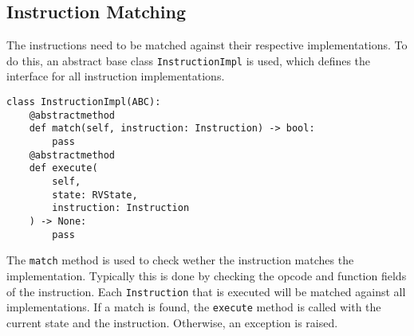 \documentclass[sigconf]{acmart}
\begin{document}
\subsection{Instruction Matching}\label{sec:instruction-matching}
The instructions need to be matched against their respective implementations. To do this, an abstract base class \texttt{InstructionImpl} is used, which defines the interface for all instruction implementations.
\begin{verbatim}
class InstructionImpl(ABC):
    @abstractmethod
    def match(self, instruction: Instruction) -> bool:
        pass
    @abstractmethod
    def execute(
        self, 
        state: RVState, 
        instruction: Instruction
    ) -> None:
        pass
\end{verbatim}
The \texttt{match} method is used to check wether the instruction matches the implementation. Typically this is done by checking the opcode and function fields of the instruction.
Each \texttt{Instruction} that is executed will be matched against all implementations. 
If a match is found, the \texttt{execute} method is called with the current state and the instruction. Otherwise, an exception is raised.
\end{document}
